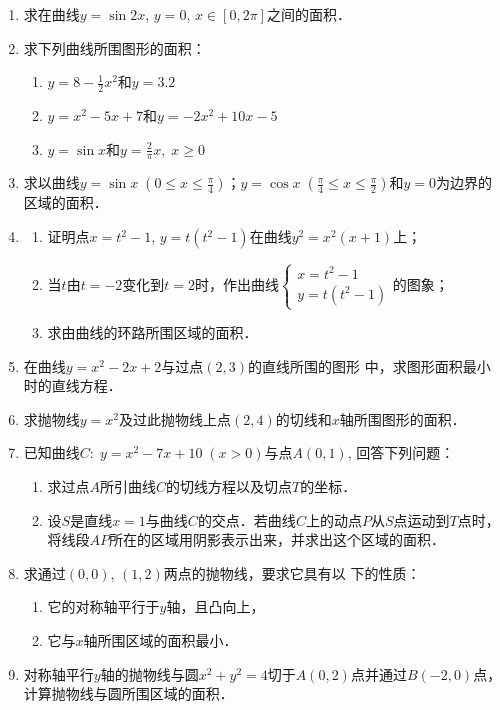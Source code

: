 \begin{ex}
\begin{enumerate}
    \item 求在曲线$y=\sin2x$, $y=0$, $x\in[0, 2\pi]$之间的面积．
    \item 求下列曲线所围图形的面积：
\begin{enumerate}
    \item $y=8-\frac{1}{2}x^2$和$y=3.2$ 
    \item $y=x^2-5x+7$和$y=-2x^2+10x-5$
    \item $y=\sin x$和$y=\frac{2}{\pi} x,\; x\ge 0$
\end{enumerate}
\item 求以曲线$y=\sin x\; \left(0\le x\le \frac{\pi}{4}\right)$；$y=\cos x\; \left(\frac{\pi}{4}\le x\le \frac{\pi}{2}\right)$和$y=0$为边界的区域的面积．

\item \begin{enumerate}
    \item 证明点$x=t^2-1$, $y=t(t^2-1)$在曲线$y^2=x^2(x+1)$上；
    \item 当$t$由$t=-2$变化到$t=2$时，作出曲线$\begin{cases}
        x=t^2-1\\y=t (t^2-1)
    \end{cases}$的图象；
\item 求由曲线的环路所围区域的面积．
\end{enumerate}

\item 在曲线$y=x^2-2x+2$与过点$(2, 3)$的直线所围的图形
中，求图形面积最小时的直线方程．
\item 求抛物线$y=x^2$及过此抛物线上点$(2, 4)$的切线和$x$轴所围图形的面积．
\item 已知曲线$C:\; y=x^2-7x+10\; (x>0)$与点$A(0, 1)$, 
回答下列问题：
\begin{enumerate}
    \item 求过点$A$所引曲线$C$的切线方程以及切点$T$的坐标．
    \item 设$S$是直线$x=1$与曲线$C$的交点．若曲线$C$上的动点$P$从$S$点运动到$T$点时，将线段$AP$所在的区域用阴影表示出来，并求出这个区域的面积．
\end{enumerate}

\item 求通过$(0, 0)$, $(1, 2)$两点的抛物线，要求它具有以
下的性质：
\begin{enumerate}
    \item 它的对称轴平行于$y$轴，且凸向上，
    \item 它与$x$轴所围区域的面积最小．
\end{enumerate}

\item 对称轴平行$y$轴的抛物线与圆$x^2+y^2=4$切于$A(0, 2)$点并通过$B(-2, 0)$点，计算抛物线与圆所围区域的面积．
\end{enumerate}
\end{ex}

